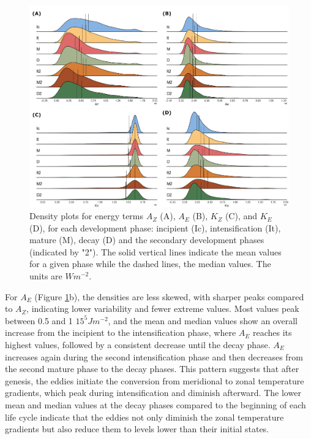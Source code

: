 \begin{figure}[!htbp]
\centering
\includegraphics[width=\textwidth]{figs_5/ridge_plot_Energy Terms.pdf}
\caption[Density Plots - Energy Terms]{Density plots for energy terms $A_Z$ (A), $A_E$ (B), $K_Z$ (C), and $K_E$ (D), for each development phase: incipient (Ic), intensification (It), mature (M), decay (D) and the secondary development phases (indicated by "2"). The solid vertical lines indicate the mean values for a given phase while the dashed lines, the median values. The units are $W m^{-2}$.}
\label{fig:ridge_plot_Energy}
\end{figure}

For $A_E$ (Figure \ref{fig:ridge_plot_Energy}b), the densities are less skewed, with sharper peaks compared to $A_Z$, indicating lower variability and fewer extreme values. Most values peak between 0.5 and 1 $15^5 J m^{-2}$, and the mean and median values show an overall increase from the incipient to the intensification phase, where $A_E$ reaches its highest values, followed by a consistent decrease until the decay phase. $A_E$ increases again during the second intensification phase and then decreases from the second mature phase to the decay phases. This pattern suggests that after genesis, the eddies initiate the conversion from meridional to zonal temperature gradients, which peak during intensification and diminish afterward. The lower mean and median values at the decay phases compared to the beginning of each life cycle indicate that the eddies not only diminish the zonal temperature gradients but also reduce them to levels lower than their initial states.

